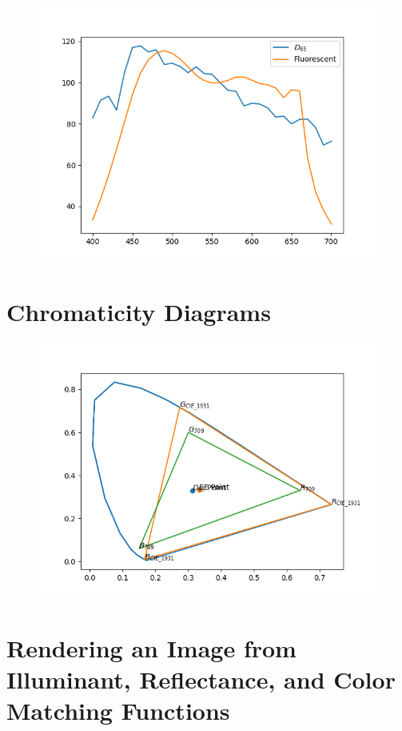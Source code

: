 \documentclass{article}
\begin{document}
\begin{figure}[H]
    \centering
    \includegraphics[width=1\textwidth]{../2-d65-and-fluorescent-illuminants.png}
\end{figure}

\section{Chromaticity Diagrams}
\begin{figure}[H]
    \centering
    \includegraphics[width=1\textwidth]{../3-chromaticities-pure-source.png}
\end{figure}

\section{Rendering an Image from Illuminant, Reflectance, and Color Matching Functions}
\end{document}
